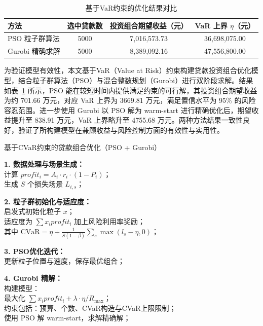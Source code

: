 \documentclass[12pt,nonblindrev]{write_paper}
\begin{document}
\begin{table}[htbp]
\centering
\caption{基于VaR约束的优化结果对比}
\begin{tabular}{lccc}
\toprule
方法 & 选中贷款数 & 投资组合期望收益（元） & VaR 上界 $\eta$（元） \\
\midrule
PSO 粒子群算法 & 5000 & 7,016,573.73 & 36,698,075.00 \\
Gurobi 精确求解 & 5000 & 8,389,092.16 & 47,556,800.00 \\
\bottomrule
\end{tabular}
\label{tab:var-results}
\end{table}

为验证模型有效性，本文基于VaR（Value at Risk）约束构建贷款投资组合优化模型，结合粒子群算法（PSO）与混合整数规划（Gurobi）进行双阶段求解。结果如表~\ref{tab:var-results} 所示，PSO 能在较短时间内提供满足约束的可行解，其投资组合期望收益为约 701.66 万元，对应 VaR 上界为 3669.81 万元，满足置信水平为 95\% 的风险容忍范围。进一步使用 Gurobi 以 PSO 解为 warm-start 进行精确优化后，期望收益提升至 838.91 万元，VaR 上界略升至 4755.68 万元。两种方法结果一致性良好，验证了所构建模型在兼顾收益与风险控制方面的有效性与实用性。

\begin{algorithm}[htbp]
\caption{基于CVaR约束的贷款组合优化（PSO + Gurobi）}

\textbf{1. 数据处理与场景生成：} \\
计算 $profit_i = A_i \cdot r_i \cdot (1 - P_i)$；\\
生成 $S$ 个损失场景 $L_{i,s}$；

\textbf{2. 粒子群初始化与适应度：} \\
启发式初始化粒子 $x$；\\
适应度为 $\sum x_i profit_i$ 加上风险利用率奖励；\\
其中 $\text{CVaR} = \eta + \frac{1}{S(1-\beta)} \sum_s \max(l_s - \eta, 0)$；

\textbf{3. PSO优化迭代：} \\
更新粒子位置与速度，保存最优组合；

\textbf{4. Gurobi 精解：} \\
构建模型：\\
最大化 $\sum x_i profit_i + \lambda \cdot \eta / R_{\max}$；\\
约束包括：预算、个数、CVaR构造与CVaR上限限制；\\
使用 PSO 解 warm-start，求解精确解；
\end{algorithm}
\end{document}
